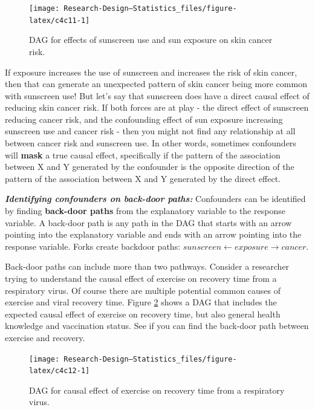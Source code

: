 \documentclass[
]{book}
\begin{document}
\begin{figure}

{\centering \texttt{[image: Research-Design---Statistics\_files/figure-latex/c4c11-1]} 

}

\caption{DAG for effects of sunscreen use and sun exposure on skin cancer risk.}\label{fig:c4c11}
\end{figure}

If exposure increases the use of sunscreen and increases the risk of skin cancer, then that can generate an unexpected pattern of skin cancer being more common with sunscreen use! But let's say that sunscreen does have a direct causal effect of reducing skin cancer risk. If both forces are at play - the direct effect of sunscreen reducing cancer risk, and the confounding effect of sun exposure increasing sunscreen use and cancer risk - then you might not find any relationship at all between cancer risk and sunscreen use. In other words, sometimes confounders will \textbf{mask} a true causal effect, specifically if the pattern of the association between X and Y generated by the confounder is the opposite direction of the pattern of the association between X and Y generated by the direct effect.

\textbf{\emph{Identifying confounders on back-door paths:}} Confounders can be identified by finding \textbf{back-door paths} from the explanatory variable to the response variable. A back-door path is any path in the DAG that starts with an arrow pointing into the explanatory variable and ends with an arrow pointing into the response variable. Forks create backdoor paths: \(sunscreen \gets exposure \to cancer\).

Back-door paths can include more than two pathways. Consider a researcher trying to understand the causal effect of exercise on recovery time from a respiratory virus. Of course there are multiple potential common causes of exercise and viral recovery time. Figure \ref{fig:c4c12} shows a DAG that includes the expected causal effect of exercise on recovery time, but also general health knowledge and vaccination status. See if you can find the back-door path between exercise and recovery.

\begin{figure}

{\centering \texttt{[image: Research-Design---Statistics\_files/figure-latex/c4c12-1]} 

}

\caption{DAG for causal effect of exercise on recovery time from a respiratory virus.}\label{fig:c4c12}
\end{figure}
\end{document}
